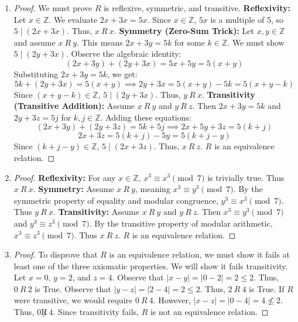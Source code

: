 \documentclass[11pt, a4paper]{article}
\theoremstyle{definition}
\theoremstyle{remark}
\newcommand{\Z}{\mathbb{Z}}
\begin{document}
\begin{enumerate}[label=\textbf{\arabic*.}, leftmargin=*]

    \item \begin{proof}
    We must prove $R$ is reflexive, symmetric, and transitive.
    \textbf{Reflexivity:} Let $x \in \Z$. We evaluate $2x + 3x = 5x$. Since $x \in \Z$, $5x$ is a multiple of 5, so $5 \mid (2x + 3x)$. Thus, $x \ R \ x$.
    \textbf{Symmetry (Zero-Sum Trick):} Let $x, y \in \Z$ and assume $x \ R \ y$. This means $2x + 3y = 5k$ for some $k \in \Z$. We must show $5 \mid (2y + 3x)$. Observe the algebraic identity:
    \[ (2x + 3y) + (2y + 3x) = 5x + 5y = 5(x + y) \]
    Substituting $2x + 3y = 5k$, we get:
    \[ 5k + (2y + 3x) = 5(x + y) \implies 2y + 3x = 5(x + y) - 5k = 5(x + y - k) \]
    Since $(x + y - k) \in \Z$, $5 \mid (2y + 3x)$. Thus, $y \ R \ x$.
    \textbf{Transitivity (Transitive Addition):} Assume $x \ R \ y$ and $y \ R \ z$. Then $2x + 3y = 5k$ and $2y + 3z = 5j$ for $k, j \in \Z$. Adding these equations:
    \[ (2x + 3y) + (2y + 3z) = 5k + 5j \implies 2x + 5y + 3z = 5(k + j) \]
    \[ 2x + 3z = 5(k + j) - 5y = 5(k + j - y) \]
    Since $(k + j - y) \in \Z$, $5 \mid (2x + 3z)$. Thus, $x \ R \ z$. $R$ is an equivalence relation.
    \end{proof}

    \item \begin{proof}
    \textbf{Reflexivity:} For any $x \in \Z$, $x^3 \equiv x^3 \pmod 7$ is trivially true. Thus $x \ R \ x$.
    \textbf{Symmetry:} Assume $x \ R \ y$, meaning $x^3 \equiv y^3 \pmod 7$. By the symmetric property of equality and modular congruence, $y^3 \equiv x^3 \pmod 7$. Thus $y \ R \ x$.
    \textbf{Transitivity:} Assume $x \ R \ y$ and $y \ R \ z$. Then $x^3 \equiv y^3 \pmod 7$ and $y^3 \equiv z^3 \pmod 7$. By the transitive property of modular arithmetic, $x^3 \equiv z^3 \pmod 7$. Thus $x \ R \ z$. $R$ is an equivalence relation.
    \end{proof}

    \item \begin{proof}
    To disprove that $R$ is an equivalence relation, we must show it fails at least one of the three axiomatic properties. We will show it fails transitivity.
    Let $x = 0$, $y = 2$, and $z = 4$.
    Observe that $|x - y| = |0 - 2| = 2 \le 2$. Thus, $0 \ R \ 2$ is True.
    Observe that $|y - z| = |2 - 4| = 2 \le 2$. Thus, $2 \ R \ 4$ is True.
    If $R$ were transitive, we would require $0 \ R \ 4$. However, $|x - z| = |0 - 4| = 4 \not\le 2$. Thus, $0 \not R \ 4$.
    Since transitivity fails, $R$ is not an equivalence relation.
    \end{proof}


\end{enumerate}
\end{document}
